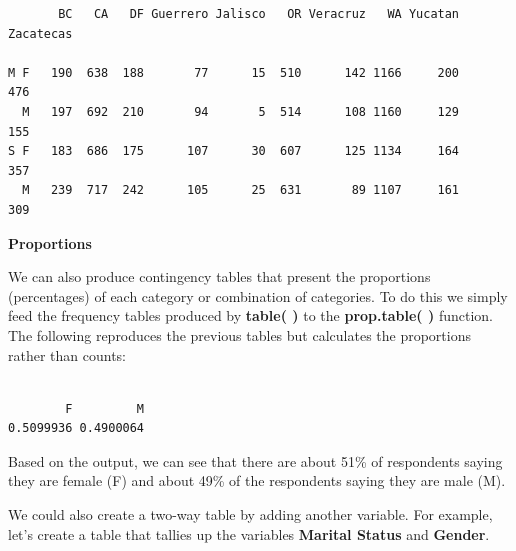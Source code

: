 \documentclass[
  letterpaper,
  DIV=11,
  numbers=noendperiod]{scrreprt}
\newenvironment{Shaded}{\begin{snugshade}}{\end{snugshade}}
\newcommand{\CommentTok}[1]{\textcolor[rgb]{0.37,0.37,0.37}{#1}}
\newcommand{\FunctionTok}[1]{\textcolor[rgb]{0.28,0.35,0.67}{#1}}
\newcommand{\NormalTok}[1]{\textcolor[rgb]{0.00,0.23,0.31}{#1}}
\newcommand{\OtherTok}[1]{\textcolor[rgb]{0.00,0.23,0.31}{#1}}
\newcommand{\SpecialCharTok}[1]{\textcolor[rgb]{0.37,0.37,0.37}{#1}}
\begin{document}
\begin{verbatim}
       BC   CA   DF Guerrero Jalisco   OR Veracruz   WA Yucatan Zacatecas
                                                                         
M F   190  638  188       77      15  510      142 1166     200       476
  M   197  692  210       94       5  514      108 1160     129       155
S F   183  686  175      107      30  607      125 1134     164       357
  M   239  717  242      105      25  631       89 1107     161       309
\end{verbatim}

\textbf{Proportions}

We can also produce contingency tables that present the proportions
(percentages) of each category or combination of categories. To do this
we simply feed the frequency tables produced by \textbf{table( )} to the
\textbf{prop.table( )} function. The following reproduces the previous
tables but calculates the proportions rather than counts:

\begin{Shaded}
\end{Shaded}

\begin{verbatim}

        F         M 
0.5099936 0.4900064 
\end{verbatim}

Based on the output, we can see that there are about 51\% of respondents
saying they are female (F) and about 49\% of the respondents saying they
are male (M).

We could also create a two-way table by adding another variable. For
example, let's create a table that tallies up the variables
\textbf{Marital Status} and \textbf{Gender}.
\end{document}
